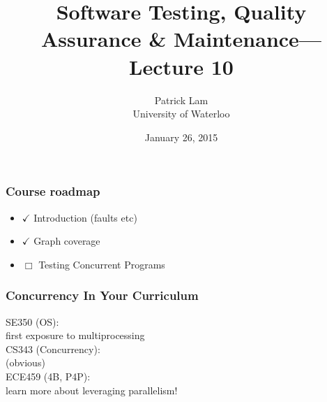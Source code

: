 \documentclass{beamer}
\title{Software Testing, Quality Assurance \& Maintenance---Lecture 10}
\author{Patrick Lam\\University of Waterloo}
\date{January 26, 2015}
\newenvironment{changemargin}[1]{%
  \begin{list}{}{%
    \setlength{\topsep}{0pt}%
    \setlength{\leftmargin}{#1}%
    \setlength{\rightmargin}{1em}
    \setlength{\listparindent}{\parindent}%
    \setlength{\itemindent}{\parindent}%
    \setlength{\parsep}{\parskip}%
  }%
  \item[]}{\end{list}}
\begin{document}
\begin{frame}
  \titlepage
\end{frame}

\begin{frame}
  \frametitle{Course roadmap}

  \begin{changemargin}{2cm}
  \begin{itemize}
  \item $\checkmark$ Introduction (faults etc)
  \item $\checkmark$ Graph coverage
  \item $\Box$ \alert{Testing Concurrent Programs}
  \end{itemize}
  \end{changemargin}
\end{frame}

\begin{frame}
\frametitle{Concurrency In Your Curriculum}
\begin{changemargin}{2cm}
  SE350 (OS): \\
  \hspace*{2em} first exposure to multiprocessing\\[1em]
  CS343 (Concurrency): \\
  \hspace*{2em} (obvious) \\[1em]
  ECE459 (4B, P4P): \\
  \hspace*{2em} learn more about leveraging parallelism!
\end{changemargin}
\end{frame}
\end{document}

